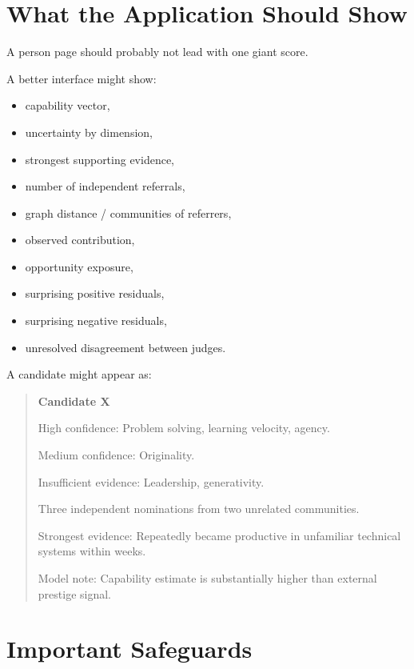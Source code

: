 \documentclass[11pt]{article}
\begin{document}
\section{What the Application Should Show}

A person page should probably not lead with one giant score.

A better interface might show:

\begin{itemize}
    \item capability vector,
    \item uncertainty by dimension,
    \item strongest supporting evidence,
    \item number of independent referrals,
    \item graph distance / communities of referrers,
    \item observed contribution,
    \item opportunity exposure,
    \item surprising positive residuals,
    \item surprising negative residuals,
    \item unresolved disagreement between judges.
\end{itemize}

A candidate might appear as:

\begin{quote}
\textbf{Candidate X}

High confidence:
Problem solving, learning velocity, agency.

Medium confidence:
Originality.

Insufficient evidence:
Leadership, generativity.

Three independent nominations from two unrelated communities.

Strongest evidence:
Repeatedly became productive in unfamiliar technical systems within weeks.

Model note:
Capability estimate is substantially higher than external prestige signal.
\end{quote}

\section{Important Safeguards}
\end{document}
